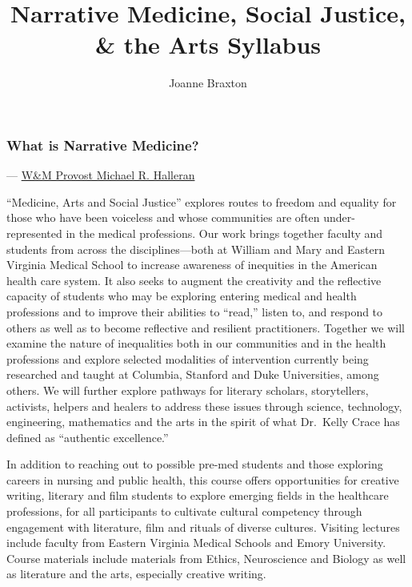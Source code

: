 \documentclass[12pt]{article}
\begin{document}
\title{Narrative Medicine, Social Justice, \& the Arts Syllabus}
\author{Joanne Braxton}

\maketitle

\noindent
\subsubsection{What is Narrative
Medicine?}\label{what-is-narrative-medicine}

 ---
\href{https://www.wm.edu/news/stories/2015/narrative-medicine-examines-charts-and-hearts.php}{W\&M
Provost Michael R. Halleran}

``Medicine, Arts and Social Justice'' explores routes to freedom and
equality for those who have been voiceless and whose communities are
often under-represented in the medical professions. Our work brings
together faculty and students from across the disciplines---both at
William and Mary and Eastern Virginia Medical School to increase
awareness of inequities in the American health care system. It also
seeks to augment the creativity and the reflective capacity of students
who may be exploring entering medical and health professions and to
improve their abilities to ``read,'' listen to, and respond to others as
well as to become reflective and resilient practitioners. Together we
will examine the nature of inequalities both in our communities and in
the health professions and explore selected modalities of intervention
currently being researched and taught at Columbia, Stanford and Duke
Universities, among others. We will further explore pathways for
literary scholars, storytellers, activists, helpers and healers to
address these issues through science, technology, engineering,
mathematics and the arts in the spirit of what Dr.~Kelly Crace has
defined as ``authentic excellence.''

In addition to reaching out to possible pre-med students and those
exploring careers in nursing and public health, this course offers
opportunities for creative writing, literary and film students to
explore emerging fields in the healthcare professions, for all
participants to cultivate cultural competency through engagement with
literature, film and rituals of diverse cultures. Visiting lectures
include faculty from Eastern Virginia Medical Schools and Emory
University. Course materials include materials from Ethics, Neuroscience
and Biology as well as literature and the arts, especially creative
writing.
\end{document}

